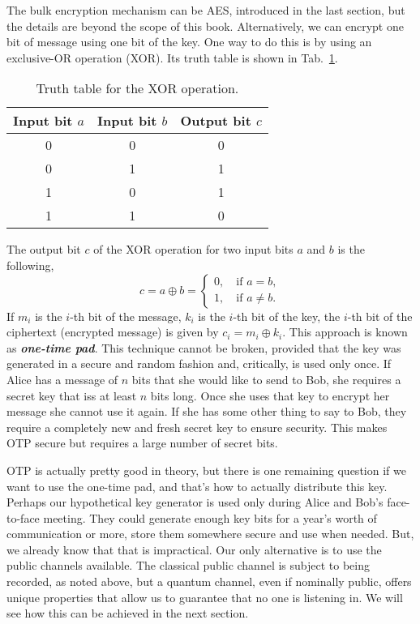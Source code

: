 The bulk encryption mechanism can be AES, introduced in the last section, but the details are beyond the scope of this book.
Alternatively, we can encrypt one bit of message using one bit of the key. 
One way to do this is by using an exclusive-OR operation (XOR).
Its truth table is shown in Tab.~\ref{tab:xor_truth_table}.
\begin{table}[t]
    \setcellgapes{5pt}
    \renewcommand\theadfont{}
    \makegapedcells
    \centering
    \begin{tabular}{ccc}
        \hline
        \textbf{Input bit $a$} & \textbf{Input bit $b$} & \textbf{Output bit $c$} \\
        \hline
        0 & 0 & 0 \\
        0 & 1 & 1 \\
        1 & 0 & 1 \\
        1 & 1 & 0 \\
        \hline
    \end{tabular}
    \caption[XOR operation.]{Truth table for the XOR operation.}
    \label{tab:xor_truth_table}
\end{table}
The output bit $c$ of the XOR operation for two input bits $a$ and $b$ is the following,
\begin{equation}
    c = a \oplus b = \begin{cases}
        0, \quad \text{if } a = b, \\
        1, \quad \text{if } a \neq b.
    \end{cases}
\end{equation}
If $m_i$ is the $i$-th bit of the message, $k_i$ is the $i$-th bit of the key, the $i$-th bit of the ciphertext (encrypted message) is given by $c_i = m_i \oplus k_i$. 
This approach is known as \textbf{\emph{one-time pad}}.
This technique cannot be broken, provided that the key was generated in a secure and random fashion and, critically, is used only once.
If Alice has a message of $n$ bits that she would like to send to Bob, she requires a secret key that iss at least $n$ bits long.
Once she uses that key to encrypt her message she cannot use it again. If she has some other thing to say to Bob, they require a completely new and fresh secret key to ensure security.
This makes OTP secure but requires a large number of secret bits.

OTP is actually pretty good in theory, but there is one remaining question if we want to use the one-time pad, and that's how to actually distribute this key.
Perhaps our hypothetical key generator is used only during Alice and Bob's face-to-face meeting.
They could generate enough key bits for a year's worth of communication or more, store them somewhere secure and use when needed.
But, we already know that that is impractical.
Our only alternative is to use the public channels available.
The classical public channel is subject to being recorded, as noted above, but a quantum channel, even if nominally public, offers unique properties that allow us to guarantee that no one is listening in.
We will see how this can be achieved in the next section.




